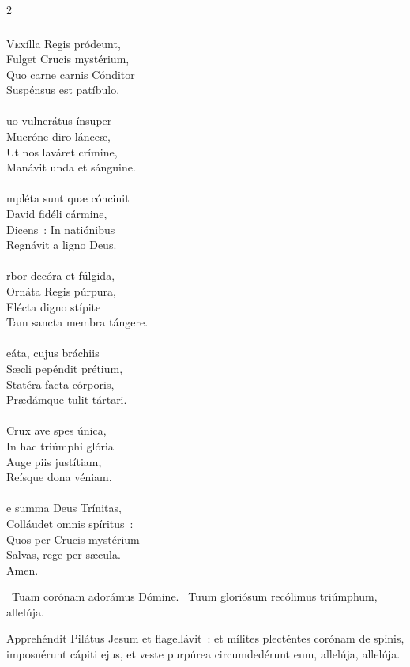 \documentclass[9pt,twoside]{extarticle}
\begin{document}
\begin{multicols}{2}
{{\subsubsection*{\center {}}
\lettrine{V}exílla Regis pródeunt,\\
Fulget Crucis mystérium,\\
Quo carne carnis Cónditor\\
Suspénsus est patíbulo.\\
\\
uo vulnerátus ínsuper\\
Mucróne diro lánceæ,\\
Ut nos laváret crímine,\\
Manávit unda et sánguine.\\
\\
mpléta sunt quæ cóncinit\\
David fidéli cármine,\\
Dicens~: In natiónibus\\
Regnávit a ligno Deus.\\
\\
rbor decóra et fúlgida,\\
Ornáta Regis púrpura,\\
Elécta digno stípite\\
Tam sancta membra tángere.\\
\\
eáta, cujus bráchiis\\
Sæcli pepéndit prétium,\\
Statéra facta córporis,\\
Prædámque tulit tártari.\\
\\
 Crux ave spes única,\\
In hac triúmphi glória\\
Auge piis justítiam,\\
Reísque dona véniam.\\
\\
e summa Deus Trínitas,\\
Colláudet omnis spíritus~:\\
Quos per Crucis mystérium\\
Salvas, rege per sæcula.\\
Amen.

\begin{tightlist}{}
\item {}~Tuam corónam adorámus Dómine. ~Tuum gloriósum recólimus triúmphum, allelúja.
\item {} Apprehéndit Pilátus Jesum et flagellávit~: et mílites plecténtes corónam de spinis, imposuérunt cápiti ejus, et veste purpúrea circumdedérunt eum, allelúja, allelúja.
\end{tightlist}

}}
\end{multicols}
\end{document}
